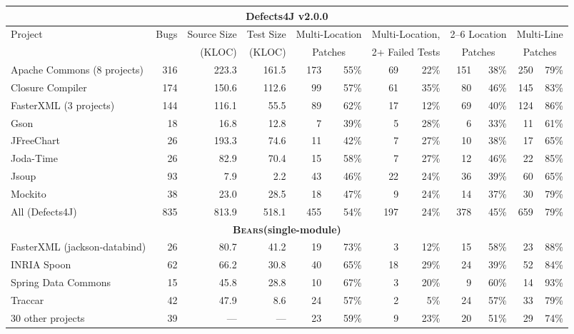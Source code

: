 \documentclass[10pt,journal,compsoc]{IEEEtran}
\newcommand\bears{\textsc{Bears}\xspace}
\begin{document}
\begin{table}
\begin{center}
\begin{tabular}{l  rrr | rr rr rr rr }
\toprule
\multicolumn{12}{c}{\textbf{Defects4J v2.0.0}} \\
\midrule
\multirow{2}{*}{Project} & \multirow{2}{*}{Bugs} & Source Size & Test Size & \multicolumn{2}{c}{Multi-Location} & \multicolumn{2}{c}{Multi-Location,}      & \multicolumn{2}{c}{2--6 Location} & \multicolumn{2}{c}{Multi-Line} \\
            &          &  (KLOC) & (KLOC)&
\multicolumn{2}{c}{Patches}              & \multicolumn{2}{c}{2+ Failed Tests}   & \multicolumn{2}{c}{Patches}             & \multicolumn{2}{c}{Patches} \\
\midrule
Apache Commons (8 projects) & 316 & 223.3 & 161.5 & 173 & 55\% & 69 & 22\% & 151 & 38\%
& 250 & 79\%\\
Closure Compiler & 174 & 150.6 & 112.6 & 99 & 57\% & 61 & 35\% & 80 & 46\% & 145
& 83\% \\
FasterXML (3 projects) & 144 & 116.1 & 55.5 & 89 & 62\% & 17 & 12\% & 69 & 40\% & 124 & 86\%\\
Gson & 18 & 16.8 & 12.8 & 7 & 39\% & 5 & 28\% & 6 & 33\% & 11 & 61\% \\
JFreeChart  & 26 & 193.3 & 74.6  & 11 & 42\% & 7 & 27\% & 10 & 38\% & 17 & 65\%\\
Joda-Time & 26 & 82.9 & 70.4 & 15 & 58\% & 7 & 27\% & 12 & 46\% & 22 & 85\% \\
Jsoup & 93 & 7.9 & 2.2 & 43 & 46\% & 22 & 24\% & 36 & 39\% & 60 & 65\% \\
Mockito & 38 & 23.0 & 28.5 & 18 & 47\% & 9 & 24\% & 14 & 37\% & 30 & 79\% \\
\midrule
All (Defects4J) & 835 & 813.9 & 518.1 & 455 & 54\% & 197 & 24\% & 378 & 45\% & 659 & 79\%\\
\midrule
\multicolumn{12}{c}{\textbf{\bears (single-module)}} \\
\midrule
FasterXML (jackson-databind) & 26 & 80.7 & 41.2 & 19 & 73\% & 3 & 12\% & 15 & 58\% & 23 & 88\% \\
INRIA Spoon & 62 & 66.2 & 30.8  & 40 & 65\% & 18 & 29\% & 24 & 39\% & 52 & 84\% \\
Spring Data Commons & 15 & 45.8 & 28.8  & 10 & 67\% & 3 & 20\% & 9 & 60\% & 14 & 93\% \\
Traccar & 42 & 47.9 & 8.6 & 24 & 57\% & 2 & 5\% & 24 & 57\% & 33 & 79\% \\
30 other projects & 39 & --- & --- & 23 & 59\% & 9 & 23\% & 20 & 51\% & 29 & 74\% \\

\end{tabular}
\end{center}
\end{table}
\end{document}
